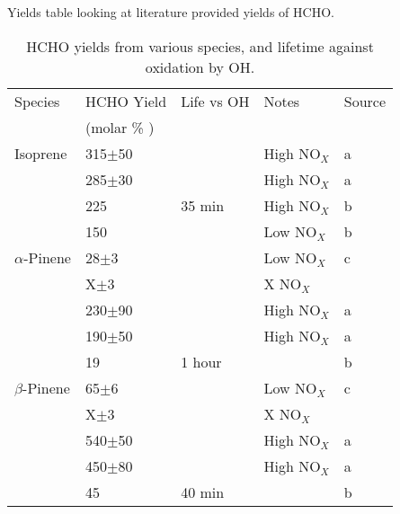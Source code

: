    
    Yields table looking at literature provided yields of HCHO.
    
    \begin{table} \begin{threeparttable}
      \caption{ HCHO yields from various species, and lifetime against oxidation by OH. }
      \begin{tabular}{  l  l  l  l  l  }
	\toprule
	Species           & HCHO Yield      & Life vs OH & Notes    & Source
	\\                & (molar \% )     &        &              &          \\
	\midrule 
	Isoprene          & 315$\pm$50      &        & High NO$_X$  & a        \\ 
			  & 285$\pm$30      &        & High NO$_X$  & a        \\ 
			  & 225             & 35 min & High NO$_X$  & b        \\ %
			  & 150             &        & Low  NO$_X$  & b        \\ %
	$\alpha$-Pinene   & 28$\pm$3        &        & Low NO$_X$   & c        \\ 
			  & X$\pm$3         &        & X NO$_X$     & \citep{Wolfe2016}      \\ 
			  & 230$\pm$90      &        & High NO$_X$  & a        \\ 
			  & 190$\pm$50      &        & High NO$_X$  & a        \\ 
			  & 19              & 1 hour &              & b        \\ %
	$\beta$-Pinene    & 65$\pm$6        &        & Low NO$_X$   & c      \\ 
			  & X$\pm$3         &        & X NO$_X$     & \citep{Wolfe2016}      \\ 
			  & 540$\pm$50      &        & High NO$_X$  & a     \\ 
			  & 450$\pm$80      &        & High NO$_X$  & a      \\ 
			  & 45              & 40 min &              & b      \\ %

\end{tabular}
\end{threeparttable}
\end{table}

